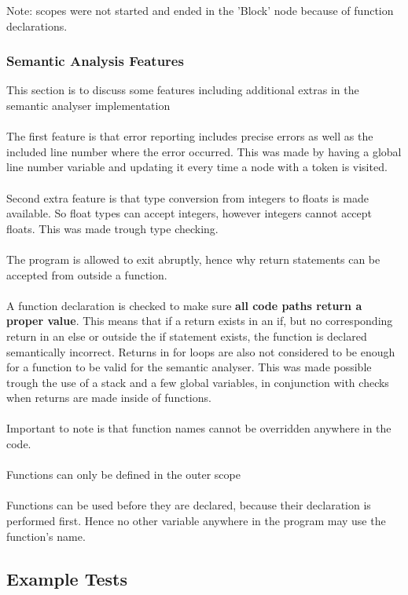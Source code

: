 Note: scopes were not started and ended in the 'Block' node because of function declarations.

\subsubsection{Semantic Analysis Features}
This section is to discuss some features including additional extras in the semantic analyser implementation
\\\\
The first feature is that error reporting includes precise errors as well as the included line number where the error occurred. This was made by having a global line number variable and updating it every time a node with a token is visited.
\\\\
Second extra feature is that type conversion from integers to floats is made available. So float types can accept integers, however integers cannot accept floats. This was made trough type checking.
\\\\
The program is allowed to exit abruptly, hence why return statements can be accepted from outside a function.
\\\\
A function declaration is checked to make sure \textbf{all code paths return a proper value}. This means that if a return exists in an if, but no corresponding return in an else or outside the if statement exists, the function is declared semantically incorrect. Returns in for loops are also not considered to be enough for a function to be valid for the semantic analyser. This was made possible trough the use of a stack and a few global variables, in conjunction with checks when returns are made inside of functions.
\\\\
Important to note is that function names cannot be overridden anywhere in the code.
\\\\
Functions can only be defined in the outer scope
\\\\ Functions can be used before they are declared, because their declaration is performed first. Hence no other variable anywhere in the program may use the function's name.

\subsection{Example Tests}

